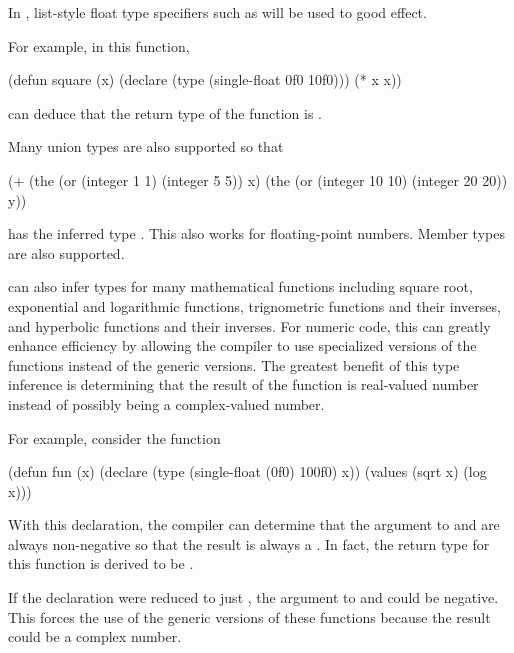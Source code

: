 In \cmucl{}, list-style float type specifiers such as
 will be used to good effect.

For example, in this function,

\begin{example}
  (defun square (x)
    (declare (type (single-float 0f0 10f0)))
    (* x x))
\end{example}

\python{} can deduce that the
return type of the function  is .

Many union types are also supported so that

\begin{example}
  (+ (the (or (integer 1 1) (integer 5 5)) x)
     (the (or (integer 10 10) (integer 20 20)) y))
\end{example}

has the inferred type .  This also works for
floating-point numbers.  Member types are also supported.
  
\cmucl{} can also infer types for many mathematical functions
including square root, exponential and logarithmic functions,
trignometric functions and their inverses, and hyperbolic functions
and their inverses.  For numeric code, this can greatly enhance
efficiency by allowing the compiler to use specialized versions of
the functions instead of the generic versions.  The greatest benefit 
of this type inference is determining that the result of the
function is real-valued number instead of possibly being
a complex-valued number.

For example, consider the function
\begin{example}
  (defun fun (x)
    (declare (type (single-float (0f0) 100f0) x))
    (values (sqrt x) (log x)))
\end{example}
With this declaration, the compiler can determine that the argument
to  and  are always non-negative so that the result 
is always a .  In fact, the return type for this
function is derived to be .

If the declaration were reduced to just , the argument to  and 
could be negative.  This forces the use of the generic versions of
these functions because the result could be a complex number.

